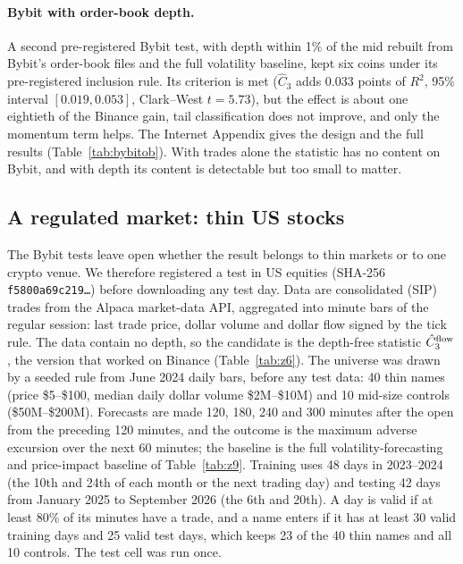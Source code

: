 \documentclass[12pt]{article}
\theoremstyle{definition}
\theoremstyle{remark}
\begin{document}
\paragraph{Bybit with order-book depth.} A second pre-registered Bybit test, with depth within 1\% of the mid rebuilt from Bybit's order-book files and the full volatility baseline, kept six coins under its pre-registered inclusion rule. Its criterion is met ($\hat C_3$ adds $0.033$ points of $R^2$, 95\% interval $[0.019,0.053]$, Clark--West $t=5.73$), but the effect is about one eightieth of the Binance gain, tail classification does not improve, and only the momentum term helps. The Internet Appendix gives the design and the full results (Table~\ref{tab:bybitob}). With trades alone the statistic has no content on Bybit, and with depth its content is detectable but too small to matter.

\subsection{A regulated market: thin US stocks}\label{sec:us}
The Bybit tests leave open whether the result belongs to thin markets or to one crypto venue. We therefore registered a test in US equities (SHA-256 \texttt{f5800a69c219\ldots}) before downloading any test day. Data are consolidated (SIP) trades from the Alpaca market-data API, aggregated into minute bars of the regular session: last trade price, dollar volume and dollar flow signed by the tick rule. The data contain no depth, so the candidate is the depth-free statistic $\hat C_3^{\rm flow}$, the version that worked on Binance (Table~\ref{tab:z6}). The universe was drawn by a seeded rule from June 2024 daily bars, before any test data: 40 thin names (price \$5--\$100, median daily dollar volume \$2M--\$10M) and 10 mid-size controls (\$50M--\$200M). Forecasts are made 120, 180, 240 and 300 minutes after the open from the preceding 120 minutes, and the outcome is the maximum adverse excursion over the next 60 minutes; the baseline is the full volatility-forecasting and price-impact baseline of Table~\ref{tab:z9}. Training uses 48 days in 2023--2024 (the 10th and 24th of each month or the next trading day) and testing 42 days from January 2025 to September 2026 (the 6th and 20th). A day is valid if at least 80\% of its minutes have a trade, and a name enters if it has at least 30 valid training days and 25 valid test days, which keeps 23 of the 40 thin names and all 10 controls. The test cell was run once.
\end{document}
